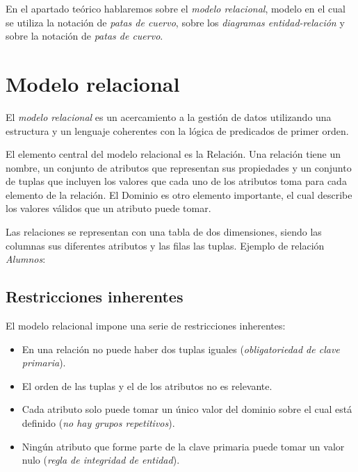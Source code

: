 En el apartado teórico hablaremos sobre el \emph{modelo relacional}, modelo en el cual se utiliza la notación de \emph{patas de cuervo}, sobre los \emph{diagramas entidad-relación} y sobre la notación de \emph{patas de cuervo}.

\section{Modelo relacional}
El \emph{modelo relacional} es un acercamiento a la gestión de datos utilizando una estructura y un lenguaje coherentes con la lógica de predicados de primer orden\cite{wiki:relational_model}.

El elemento central del modelo relacional es la Relación. Una relación tiene un nombre, un conjunto de atributos que representan sus propiedades y un conjunto de tuplas que incluyen los valores que cada uno de los atributos toma para cada elemento de la relación. El Dominio es otro elemento importante, el cual describe los valores válidos que un atributo puede tomar\cite{des-bd}.

Las relaciones se representan con una tabla de dos dimensiones, siendo las columnas sus diferentes atributos y las filas las tuplas. Ejemplo de relación \textit{Alumnos}:

\subsection{Restricciones inherentes}
El modelo relacional impone una serie de restricciones inherentes:
\begin{itemize}
    \item En una relación no puede haber dos tuplas iguales (\textit{obligatoriedad de clave primaria}).
    \item El orden de las tuplas y el de los atributos no es relevante.
    \item Cada atributo solo puede tomar un único valor del dominio sobre el cual está definido (\textit{no hay grupos repetitivos}).
    \item Ningún atributo que forme parte de la clave primaria puede tomar un valor nulo (\textit{regla de integridad de entidad}).
\end{itemize}

